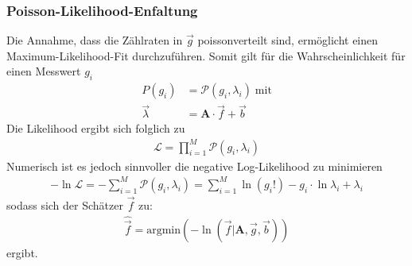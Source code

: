 \subsubsection{Poisson-Likelihood-Enfaltung}
Die Annahme, dass die Zählraten in $\vec{g}$ poissonverteilt sind, ermöglicht einen Maximum-Likelihood-Fit durchzuführen. Somit gilt für die Wahrscheinlichkeit für einen Messwert $g_{i}$
\begin{align}
	P(g_{i}) &= \mathcal{P}(g_{i},\lambda_{i}) \; \text{mit}\\
	\vec{\lambda} &= \pmb{A} \cdot \vec{f} + \vec{b}
\end{align}
Die Likelihood ergibt sich folglich zu
\begin{align}
	\mathcal{L} = \prod_{i=1}^{M}\mathcal{P}(g_{i},\lambda_{i})
\end{align}
Numerisch ist es jedoch sinnvoller die negative Log-Likelihood zu minimieren
\begin{align}
	- \ln\mathcal{L} = - \sum_{i=1}^{M}\mathcal{P}(g_{i},\lambda_{i}) = \sum_{i=1}^{M}\ln(g_{i}!) - g_{i} \cdot \ln \lambda_{i} +\lambda_{i}
	\label{eqn:loglike}
\end{align}
sodass sich der Schätzer $\vec{f}$ zu:
\begin{align}
	\hat{\vec{f}} = \text{argmin}\left( -\ln(\vec{f}|\pmb{A},\vec{g},\vec{b})\right)
	\label{eqn:fLike}
\end{align}
ergibt.
